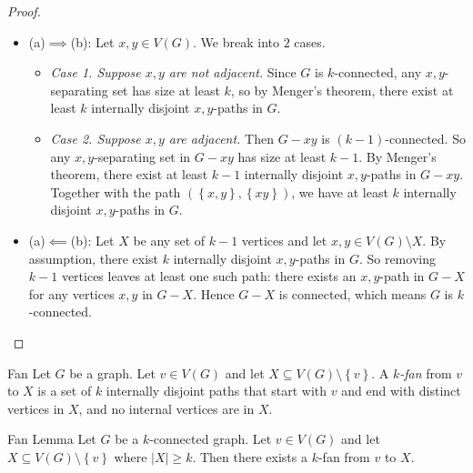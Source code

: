 \documentclass[co342]{subfiles}
\begin{document}
    \begin{proof}
        \begin{itemize}
            \item (a)$\implies$(b): Let $x,y\in V\left( G \right)$. We break into $2$ cases.
                \begin{itemize}
                    \item \textit{Case 1. Suppose $x,y$ are not adjacent.} Since $G$ is $k$-connected, any $x,y$-separating set has size at least $k$, so by Menger's theorem, there exist at least $k$ internally disjoint $x,y$-paths in $G$.
                    \item \textit{Case 2. Suppose $x,y$ are adjacent.} Then $G-xy$ is $\left( k-1 \right)$-connected. So any $x,y$-separating set in $G-xy$ has size at least $k-1$. By Menger's theorem, there exist at least $k-1$ internally disjoint $x,y$-paths in $G-xy$. Together with the path $\left( \left\lbrace x,y \right\rbrace, \left\lbrace xy \right\rbrace \right)$, we have at least $k$ internally disjoint $x,y$-paths in $G$.
                \end{itemize} 
            \item (a)$\impliedby$(b): Let $X$ be any set of $k-1$ vertices and let $x,y\in V\left( G \right)\setminus X$. By assumption, there exist $k$ internally disjoint $x,y$-paths in $G$. So removing $k-1$ vertices leaves at least one such path: there exists an $x,y$-path in $G-X$ for any vertices $x,y$ in $G-X$. Hence $G-X$ is connected, which means $G$ is $k$-connected. \qqedsym
        \end{itemize} 
    \end{proof}

    \begin{definition}{Fan}{}
        Let $G$ be a graph. Let $v\in V\left( G \right)$ and let $X\subseteq V\left( G \right)\setminus \left\lbrace v \right\rbrace$. A \emph{$k$-fan} from $v$ to $X$ is a set of $k$ internally disjoint paths that start with $v$ and end with distinct vertices in $X$, and no internal vertices are in $X$.
    \end{definition}

    \begin{cor}{Fan Lemma}
        Let $G$ be a $k$-connected graph. Let $v\in V\left( G \right)$ and let $X\subseteq V\left( G \right)\setminus \left\lbrace v \right\rbrace$ where $\left| X \right|\geq k$. Then there exists a $k$-fan from $v$ to $X$.
    \end{cor}	
\end{document}
